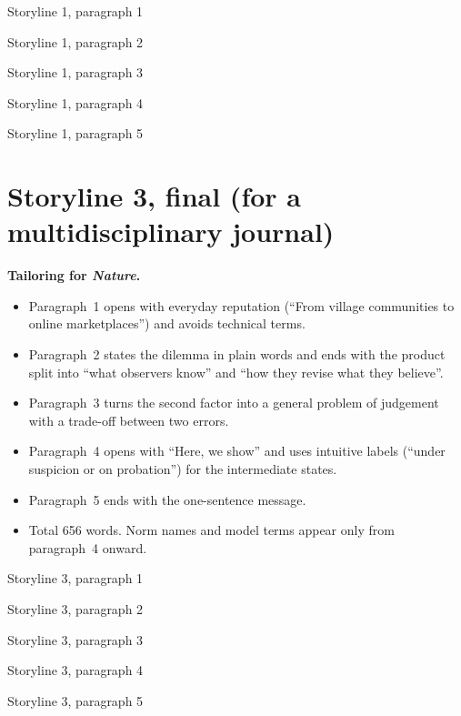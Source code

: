 \documentclass[11pt]{article}
\begin{document}
\begin{draft}{Storyline 1, paragraph 1}\end{draft}
\begin{draft}{Storyline 1, paragraph 2}\end{draft}
\begin{draft}{Storyline 1, paragraph 3}\end{draft}
\begin{draft}{Storyline 1, paragraph 4}\end{draft}
\begin{draft}{Storyline 1, paragraph 5}\end{draft}

\section{Storyline 3, final (for a multidisciplinary journal)}

\textbf{Tailoring for \textit{Nature}.}
\begin{itemize}[leftmargin=1.2em]
\item Paragraph~1 opens with everyday reputation (``From village communities to online marketplaces'') and avoids technical terms.
\item Paragraph~2 states the dilemma in plain words and ends with the product split into ``what observers know'' and ``how they revise what they believe''.
\item Paragraph~3 turns the second factor into a general problem of judgement with a trade-off between two errors.
\item Paragraph~4 opens with ``Here, we show'' and uses intuitive labels (``under suspicion or on probation'') for the intermediate states.
\item Paragraph~5 ends with the one-sentence message.
\item Total 656 words. Norm names and model terms appear only from paragraph~4 onward.
\end{itemize}

\begin{draft}{Storyline 3, paragraph 1}\end{draft}
\begin{draft}{Storyline 3, paragraph 2}\end{draft}
\begin{draft}{Storyline 3, paragraph 3}\end{draft}
\begin{draft}{Storyline 3, paragraph 4}\end{draft}
\begin{draft}{Storyline 3, paragraph 5}\end{draft}
\end{document}
